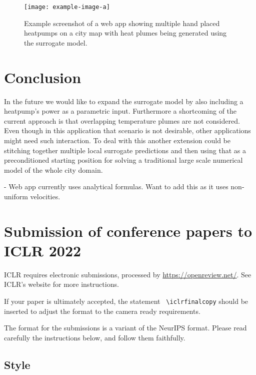 \documentclass{article} %
\begin{document}
\begin{figure}[htb]
   \centering
   \texttt{[image: example-image-a]}
   \caption{Example screenshot of a web app showing multiple hand placed heatpumps on a city map with heat plumes being generated using the surrogate model.}
\end{figure}

\section{Conclusion}
\label{sec:conclusion}




In the future we would like to expand the surrogate model by also including a heatpump's power as a parametric input.
Furthermore a shortcoming of the current approach is that overlapping temperature plumes are not considered.
Even though in this application that scenario is not desirable, other applications might need such interaction.
To deal with this another extension could be stitching together multiple local surrogate predictions and then using that as a preconditioned starting position for solving a traditional large scale numerical model of the whole city domain.

- Web app currently uses analytical formulas. Want to add this as it uses non-uniform velocities.

\section{Submission of conference papers to ICLR 2022}

ICLR requires electronic submissions, processed by
\url{https://openreview.net/}. See ICLR's website for more instructions.

If your paper is ultimately accepted, the statement {\tt
      {\textbackslash}iclrfinalcopy} should be inserted to adjust the
format to the camera ready requirements.

The format for the submissions is a variant of the NeurIPS format.
Please read carefully the instructions below, and follow them
faithfully.

\subsection{Style}
\end{document}

